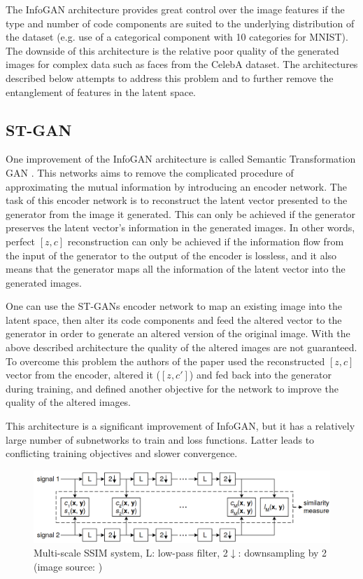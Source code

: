 \documentclass{egpubl}
\begin{document}
The InfoGAN architecture provides great control over the image features if the type and number of code components are suited to the underlying distribution of the dataset (e.g. use of a categorical component with 10 categories for MNIST). The downside of this architecture is the relative poor quality of the generated images for complex data such as faces from the CelebA dataset. The architectures described below attempts to address this problem and to further remove the entanglement of features in the latent space.


\subsection{ST-GAN}
\label{sec:propDet}

One improvement of the InfoGAN architecture is called Semantic Transformation GAN \cite{liu2019stgan}. This networks aims to remove the complicated procedure of approximating the mutual information by introducing an encoder network. The task of this encoder network is to reconstruct the latent vector presented to the generator from the image it generated. This can only be achieved if the generator preserves the latent vector's information in the generated images. In other words, perfect $[z,c]$ reconstruction can only be achieved if the information flow from the input of the generator to the output of the encoder is lossless, and it also means that the generator maps all the information of the latent vector into the generated images.

One can use the ST-GANs encoder network to map an existing image into the latent space, then alter its code components and feed the altered vector to the generator in order to generate an altered version of the original image. With the above described architecture the quality of the altered images are not guaranteed. To overcome this problem the authors of the paper used the reconstructed $[z,c]$ vector from the encoder, altered it ($[z,c']$) and fed back into the generator during training, and defined another objective for the network to improve the quality of the altered images.

This architecture is a significant improvement of InfoGAN, but it has a relatively large number of subnetworks to train and loss functions. Latter leads to conflicting training objectives and slower convergence.

\begin{figure}[!htb]
	\centering
	\includegraphics[width=\textwidth]{pic/MS-SSIM}
	\caption{Multi-scale SSIM system, L: low-pass filter, 2$\downarrow$: downsampling by 2 (image source: \cite{1292216})}
	\label{fig:ms_ssim}
\end{figure}
\end{document}
